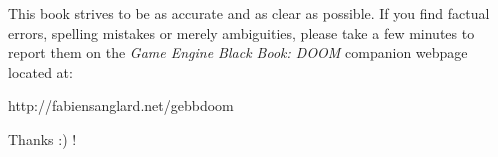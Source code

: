 This book strives to be as accurate and as clear as possible. If you find factual errors, spelling mistakes or merely ambiguities, please take a few minutes to report them on the \textit{Game Engine Black Book: DOOM} companion webpage located at:\\
\par
http://fabiensanglard.net/gebbdoom\\
\par
Thanks :) !
